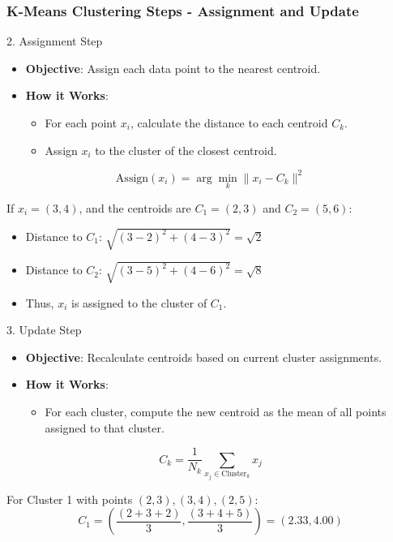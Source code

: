 \documentclass[aspectratio=169]{beamer}
\begin{document}
\begin{frame}
    \frametitle{K-Means Clustering Steps - Assignment and Update}
    \begin{block}{2. Assignment Step}
        \begin{itemize}
            \item \textbf{Objective}: Assign each data point to the nearest centroid.
            \item \textbf{How it Works}:
            \begin{itemize}
                \item For each point \(x_i\), calculate the distance to each centroid \(C_k\).
                \item Assign \(x_i\) to the cluster of the closest centroid.
            \end{itemize}
        \end{itemize}
        \begin{equation}
            \text{Assign}(x_i) = \arg \min_k \|x_i - C_k\|^2
        \end{equation}
        \begin{example}
            If \(x_i = (3, 4)\), and the centroids are \(C_1 = (2, 3)\) and \(C_2 = (5, 6)\):
            \begin{itemize}
                \item Distance to \(C_1\): \(\sqrt{(3-2)^2 + (4-3)^2} = \sqrt{2}\)
                \item Distance to \(C_2\): \(\sqrt{(3-5)^2 + (4-6)^2} = \sqrt{8}\)
                \item Thus, \(x_i\) is assigned to the cluster of \(C_1\).
            \end{itemize}
        \end{example}
    \end{block}

    \begin{block}{3. Update Step}
        \begin{itemize}
            \item \textbf{Objective}: Recalculate centroids based on current cluster assignments.
            \item \textbf{How it Works}:
            \begin{itemize}
                \item For each cluster, compute the new centroid as the mean of all points assigned to that cluster.
            \end{itemize}
        \end{itemize}
        \begin{equation}
            C_k = \frac{1}{N_k} \sum_{x_j \in \text{Cluster}_k} x_j
        \end{equation}
        \begin{example}
            For Cluster 1 with points \((2,3), (3,4), (2,5)\):
            \[
            C_1 = \left( \frac{(2+3+2)}{3}, \frac{(3+4+5)}{3} \right) = (2.33, 4.00)
            \]
        \end{example}
    \end{block}
\end{frame}
\end{document}
